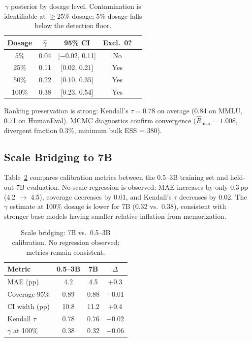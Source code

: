 \documentclass[letterpaper,11pt]{article}
\begin{document}
\begin{table}[t]
\centering
\caption{$\gamma$ posterior by dosage level. Contamination is identifiable at $\geq$25\% dosage; 5\% dosage falls below the detection floor.}
\label{tab:dose_response}
\small
\begin{tabular}{ccccc}
\toprule
Dosage & $\hat{\gamma}$ & 95\% CI & Excl.\ 0? \\
\midrule
5\% & 0.04 & [$-$0.02, 0.11] & No \\
25\% & 0.11 & [0.02, 0.21] & Yes \\
50\% & 0.22 & [0.10, 0.35] & Yes \\
100\% & 0.38 & [0.23, 0.54] & Yes \\
\bottomrule
\end{tabular}
\end{table}

Ranking preservation is strong: Kendall's $\tau = 0.78$ on average (0.84 on MMLU, 0.71 on HumanEval). MCMC diagnostics confirm convergence ($\hat{R}_{\max} = 1.008$, divergent fraction 0.3\%, minimum bulk ESS = 380).

\subsection{Scale Bridging to 7B}
\label{sec:scale}

Table~\ref{tab:scale} compares calibration metrics between the 0.5--3B training set and held-out 7B evaluation. No scale regression is observed: MAE increases by only 0.3\,pp (4.2 $\to$ 4.5), coverage decreases by 0.01, and Kendall's $\tau$ decreases by 0.02. The $\gamma$ estimate at 100\% dosage is lower for 7B (0.32 vs.\ 0.38), consistent with stronger base models having smaller relative inflation from memorization.

\begin{table}[t]
\centering
\caption{Scale bridging: 7B vs.\ 0.5--3B calibration. No regression observed; metrics remain consistent.}
\label{tab:scale}
\small
\begin{tabular}{lccc}
\toprule
Metric & 0.5--3B & 7B & $\Delta$ \\
\midrule
MAE (pp) & 4.2 & 4.5 & +0.3 \\
Coverage 95\% & 0.89 & 0.88 & $-$0.01 \\
CI width (pp) & 10.8 & 11.2 & +0.4 \\
Kendall $\tau$ & 0.78 & 0.76 & $-$0.02 \\
$\gamma$ at 100\% & 0.38 & 0.32 & $-$0.06 \\
\bottomrule
\end{tabular}
\end{table}
\end{document}
